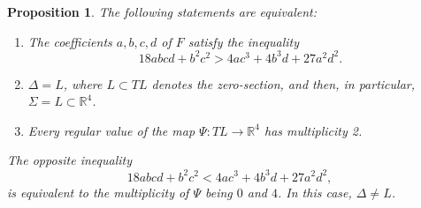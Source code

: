 \documentclass[12pt]{article}
\newtheorem{proposition}[lemma]{Proposition}
\newcommand{\R}{{\mathbb R}}
\begin{document}
\begin{proposition}\label{prop:abcd_example_and_wall} 
The following statements are equivalent:
\begin{enumerate}   \renewcommand{\theenumi}{\roman{enumi}}\renewcommand{\labelenumi}{\rm (\theenumi)} %
\item The coefficients $a,b,c,d$ of $F$ satisfy the inequality 
\begin{equation}\label{eq:no_wall_condition_cubic_examples}
18abcd+b^2c^2>4ac^3+4b^3d+27a^2d^2.
\end{equation}
\item $\Delta=L$, where $L\subset TL$ denotes the zero-section, and then, in particular, $\Sigma=L\subset\R^4$.
\item Every regular value of the map $\Psi:TL\to\R^4$ has multiplicity 2.
\end{enumerate}
The opposite inequality 
\begin{equation}\label{eq:no_wall_condition_cubic_examples_other_way_round}
18abcd+b^2c^2<4ac^3+4b^3d+27a^2d^2,
\end{equation}
is equivalent to the multiplicity of $\Psi$ being $0$ and $4$. In this case, $\Delta\neq L$.
\end{proposition}
\end{document}
